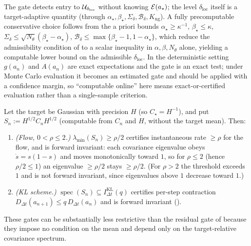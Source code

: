 \begin{remark}
\label{rem:threshold-computable}
The gate detects entry to $\mathcal{U}_{\delta_{\mathrm{loc}}}$ without knowing $\mathcal{E}(a_\star)$;
the level $\delta_{\mathrm{loc}}$ itself is a target-adaptive quantity
(through $\alpha_\star,\beta_\star,\Sigma_\delta,\mathcal B_\delta,K_{\mathrm{ng}}$). A fully
precomputable conservative choice follows from the a priori bounds
$\alpha_\star\geq\kappa^{-1}$, $\beta_\star\leq\kappa$,
$\Sigma_\delta\leq\sqrt{N_\theta}(\beta_\star-\alpha_\star)$,
$\mathcal B_\delta\leq\max\{\beta_\star-1,1-\alpha_\star\}$, which reduce the admissibility
condition of  to a scalar inequality in $\alpha,\beta,N_\theta$ alone,
yielding a computable lower bound on the admissible $\delta_{\mathrm{loc}}$. In the
deterministic setting $g(a_n)$ and $A(a_n)$ are exact expectations and the gate is an exact
test; under Monte Carlo evaluation it becomes an estimated gate and should be applied with a
confidence margin, so ``computable online'' here means exact-or-certified evaluation rather
than a single-sample criterion.
\end{remark}

\begin{proposition}
\label{prop:entry-gauss}
Let the target be Gaussian with precision $H$ (so $C_\star=H^{-1}$), and put
$S_n:=H^{1/2}C_nH^{1/2}$ (computable from $C_n$ and $H$, without the target mean). Then:
\begin{enumerate}
\item \emph{(Flow, $0<\rho\leq2$.)} $\lambda_{\min}(S_n)\geq\rho/2$ certifies instantaneous
rate $\geq\rho$ for the flow, and is forward invariant: each covariance eigenvalue obeys
$\dot s=s(1-s)$ and moves monotonically toward $1$, so for $\rho\leq2$ (hence $\rho/2\leq1$)
an eigenvalue $\geq\rho/2$ stays $\geq\rho/2$. (For $\rho>2$ the threshold exceeds $1$ and is
not forward invariant, since eigenvalues above $1$ decrease toward $1$.)
\item \emph{(KL scheme.)} $\operatorname{spec}(S_n)\subseteq I_{\Delta t}^{\mathrm{KL}}(q)$
certifies per-step contraction $D_{\Delta t}(a_{n+1})\leq q\,D_{\Delta t}(a_n)$ and is forward
invariant ().
\end{enumerate}
These gates can be substantially less restrictive than the residual gate of
 because they impose no condition on the mean and depend only on
the target-relative covariance spectrum.
\end{proposition}

